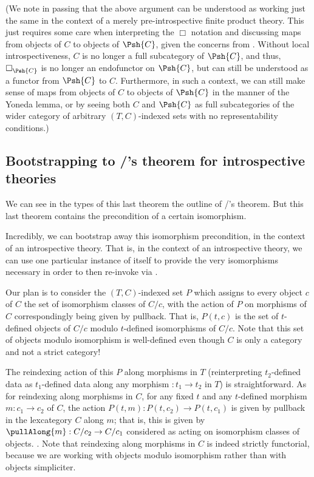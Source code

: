 (We note in passing that the above argument can be understood as working just the same in the context of a merely pre-introspective finite product theory. This just requires some care when interpreting the $\Box$ notation and discussing maps from objects of $C$ to objects of $\Psh{C}$, given the concerns from . Without local introspectiveness, $C$ is no longer a full subcategory of $\Psh{C}$, and thus, $\Box_{\Psh{C}}$ is no longer an endofunctor on $\Psh{C}$, but can still be understood as a functor from $\Psh{C}$ to $C$. Furthermore, in such a context, we can still make sense of maps from objects of $C$ to objects of $\Psh{C}$ in the manner of the Yoneda lemma, or by seeing both $C$ and $\Psh{C}$ as full subcategories of the wider category of arbitrary $(T, C)$-indexed sets with no representability conditions.)

\subsection{Bootstrapping to \Loeb/'s theorem for introspective theories}
We can see in the types of this last theorem the outline of \Loeb/'s theorem. But this last theorem contains the precondition of a certain isomorphism.

Incredibly, we can bootstrap away this isomorphism precondition, in the context of an introspective theory. That is, in the context of an introspective theory, we can use one particular instance of  itself to provide the very isomorphisms necessary in order to then re-invoke  via .

Our plan is to consider the $(T, C)$-indexed set $P$ which assigns to every object $c$ of $C$ the set of isomorphism classes of $C/c$, with the action of $P$ on morphisms of $C$ correspondingly being given by pullback. That is, $P(t, c)$ is the set of $t$-defined objects of $C/c$ modulo $t$-defined isomorphisms of $C/c$. Note that this set of objects modulo isomorphism is well-defined even though $C$ is only a category and not a strict category! 

The reindexing action of this $P$ along morphisms in $T$ (reinterpreting $t_2$-defined data as $t_1$-defined data along any morphism $: t_1 \to t_2$ in $T$) is straightforward. As for reindexing along morphisms in $C$, for any fixed $t$ and any $t$-defined morphism $m : c_1 \to c_2$ of $C$, the action $P(t, m) : P(t, c_2) \to P(t, c_1)$ is given by pullback in the lexcategory $C$ along $m$; that is, this is given by $\pullAlong{m} : C/c_2 \to C/c_1$ considered as acting on isomorphism classes of objects. . Note that reindexing along morphisms in $C$ is indeed strictly functorial, because we are working with objects modulo isomorphism rather than with objects simpliciter.

